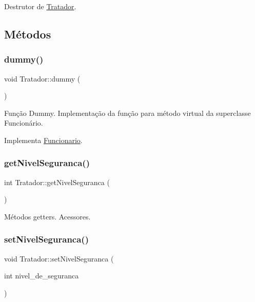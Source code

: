 Destrutor de \hyperlink{classTratador}{Tratador}. 

\subsection{Métodos}
\mbox{\label{classTratador_a399c02d81fb4e7adaeda1d5e68afbca8}} 
\subsubsection{\texorpdfstring{dummy()}{dummy()}}
{\footnotesize\ttfamily void Tratador\+::dummy (\begin{DoxyParamCaption}{ }\end{DoxyParamCaption})\hspace{0.3cm}{\ttfamily [virtual]}}

Função Dummy. Implementação da função para método virtual da superclasse Funcionário. 

Implementa \hyperlink{classFuncionario_a56aa6d780ba9ac728fad0cde3a71e9d8}{Funcionario}.

\mbox{\label{classTratador_aad65cccc398a703dbe1351ee322a71fe}} 
\subsubsection{\texorpdfstring{get\+Nivel\+Seguranca()}{getNivelSeguranca()}}
{\footnotesize\ttfamily int Tratador\+::get\+Nivel\+Seguranca (\begin{DoxyParamCaption}{ }\end{DoxyParamCaption})}

Métodos getters. Acessores. \mbox{\label{classTratador_a8d13e75b472634c87b517b1ee62694d2}} 
\subsubsection{\texorpdfstring{set\+Nivel\+Seguranca()}{setNivelSeguranca()}}
{\footnotesize\ttfamily void Tratador\+::set\+Nivel\+Seguranca (\begin{DoxyParamCaption}\item[{int}]{nivel\+\_\+de\+\_\+seguranca }\end{DoxyParamCaption})}

